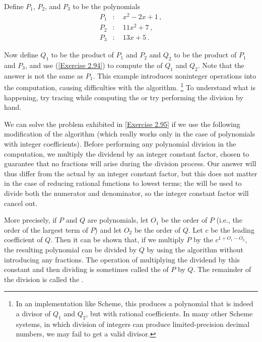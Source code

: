 \begin{exercise}
	\label{Exercise 2.95}
	Define \( P_1 \), \( P_2 \), and \( P_3 \) to be the polynomials
	\begin{align*}
		P_1 &: \quad x^2 - 2 x + 1 \,, \\
		P_2 &: \quad 11 x^2 + 7 \,,    \\
		P_3 &: \quad 13 x + 5 \,.
	\end{align*}

	Now define \( Q_1 \) to be the product of \( P_1 \) and \( P_2 \) and \( Q_2 \) to be the product of \( P_1 \) and \( P_3 \), and use  (\cref{Exercise 2.94}) to compute the  of \( Q_1 \) and \( Q_2 \).
	Note that the answer is not the same as \( P_1 \).
	This example introduces noninteger operations into the computation, causing difficulties with the  algorithm.%
	\footnote{
		In an implementation like  Scheme, this produces a polynomial that is indeed a divisor of \( Q_1 \) and \( Q_2 \), but with rational coefficients.
		In many other Scheme systems, in which division of integers can produce limited-precision decimal numbers, we may fail to get a valid divisor.
	}
	To understand what is happening, try tracing  while computing the  or try performing the division by hand.
\end{exercise}

We can solve the problem exhibited in \cref{Exercise 2.95} if we use the following modification of the  algorithm (which really works only in the case of polynomials with integer coefficients).
Before performing any polynomial division in the  computation, we multiply the dividend by an integer constant factor, chosen to guarantee that no fractions will arise during the division process.
Our answer will thus differ from the actual  by an integer constant factor, but this does not matter in the case of reducing rational functions to lowest terms;
the  will be used to divide both the numerator and denominator, so the integer constant factor will cancel out.

More precisely, if \( P \) and \( Q \) are polynomials, let \( O_1 \) be the order of \( P \) (i.e., the order of the largest term of \( P \)) and let \( O_2 \) be the order of \( Q \).
Let \( c \) be the leading coefficient of \( Q \).
Then it can be shown that, if we multiply \( P \) by the  \( c^{1 + O_1 - O_2} \), the resulting polynomial can be divided by \( Q \) by using the  algorithm without introducing any fractions.
The operation of multiplying the dividend by this constant and then dividing is sometimes called the  of \( P \) by \( Q \).
The remainder of the division is called the .



